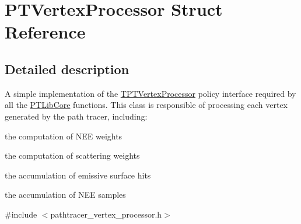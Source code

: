 \hypertarget{struct_p_t_vertex_processor}{}\section{P\+T\+Vertex\+Processor Struct Reference}
\label{struct_p_t_vertex_processor}


\subsection{Detailed description}
A simple implementation of the \hyperlink{_p_t_lib_page_TPTVertexProcessor}{T\+P\+T\+Vertex\+Processor} policy interface required by all the \hyperlink{group___p_t_lib_core}{P\+T\+Lib\+Core} functions. This class is responsible of processing each vertex generated by the path tracer, including\+: \begin{DoxyParagraph}{}

\begin{DoxyItemize}
\item the computation of N\+EE weights
\item the computation of scattering weights
\item the accumulation of emissive surface hits
\item the accumulation of N\+EE samples 
\end{DoxyItemize}
\end{DoxyParagraph}


{\ttfamily \#include $<$pathtracer\+\_\+vertex\+\_\+processor.\+h$>$}

